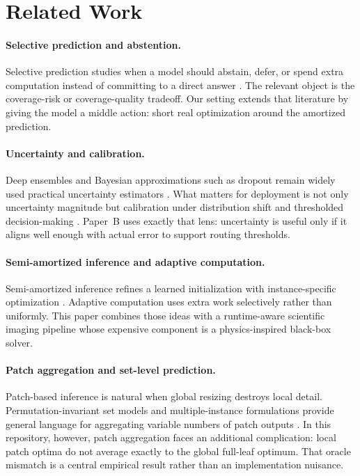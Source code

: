 \documentclass[11pt,a4paper]{article}
\begin{document}
\section{Related Work}
\paragraph{Selective prediction and abstention.}
Selective prediction studies when a model should abstain, defer, or spend extra computation instead of committing to a direct answer \citep{B_elyaniv2010,B_geifman2017,B_geifman2019}.
The relevant object is the coverage-risk or coverage-quality tradeoff.
Our setting extends that literature by giving the model a middle action: short real optimization around the amortized prediction.

\paragraph{Uncertainty and calibration.}
Deep ensembles and Bayesian approximations such as dropout remain widely used practical uncertainty estimators \citep{B_lakshminarayanan2017,B_gal2016}.
What matters for deployment is not only uncertainty magnitude but calibration under distribution shift and thresholded decision-making \citep{B_ovadia2019,B_guo2017}.
Paper~B uses exactly that lens: uncertainty is useful only if it aligns well enough with actual error to support routing thresholds.

\paragraph{Semi-amortized inference and adaptive computation.}
Semi-amortized inference refines a learned initialization with instance-specific optimization \citep{B_kim2018,B_marino2018}.
Adaptive computation uses extra work selectively rather than uniformly.
This paper combines those ideas with a runtime-aware scientific imaging pipeline whose expensive component is a physics-inspired black-box solver.

\paragraph{Patch aggregation and set-level prediction.}
Patch-based inference is natural when global resizing destroys local detail.
Permutation-invariant set models and multiple-instance formulations provide general language for aggregating variable numbers of patch outputs \citep{B_zaheer2017,B_ilse2018}.
In this repository, however, patch aggregation faces an additional complication: local patch optima do not average exactly to the global full-leaf optimum.
That oracle mismatch is a central empirical result rather than an implementation nuisance.
\end{document}
